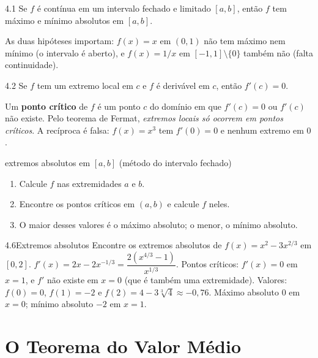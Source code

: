 \begin{teorema}{4.1}
Se $f$ é contínua em um intervalo fechado e limitado $[a,b]$, então $f$ tem máximo e mínimo
absolutos em $[a,b]$.
\end{teorema}

As duas hipóteses importam: $f(x)=x$ em $(0,1)$ não tem máximo nem mínimo (o intervalo é
aberto), e $f(x)=1/x$ em $[-1,1]\setminus\{0\}$ também não (falta continuidade).

\begin{teorema}{4.2}
Se $f$ tem um extremo local em $c$ e $f$ é derivável em $c$, então $f'(c)=0$.
\end{teorema}

Um \textbf{ponto crítico} de $f$ é um ponto $c$ do domínio em que $f'(c)=0$ ou $f'(c)$ não
existe. Pelo teorema de Fermat, \emph{extremos locais só ocorrem em pontos críticos}. A
recíproca é falsa: $f(x)=x^3$ tem $f'(0)=0$ e nenhum extremo em $0$.

\begin{estrategia}{extremos absolutos em $[a,b]$ (método do intervalo fechado)}
\begin{enumerate}[label=\arabic*.]
\item Calcule $f$ nas extremidades $a$ e $b$.
\item Encontre os pontos críticos em $(a,b)$ e calcule $f$ neles.
\item O maior desses valores é o máximo absoluto; o menor, o mínimo absoluto.
\end{enumerate}
\end{estrategia}

\begin{exemplo}{4.6}{Extremos absolutos}
Encontre os extremos absolutos de $f(x)=x^2-3x^{2/3}$ em $[0,2]$.
\solucao
$f'(x)=2x-2x^{-1/3}=\dfrac{2(x^{4/3}-1)}{x^{1/3}}$. Pontos críticos: $f'(x)=0$ em $x=1$, e
$f'$ não existe em $x=0$ (que é também uma extremidade). Valores: $f(0)=0$, $f(1)=-2$ e
$f(2)=4-3\sqrt[3]4\approx-0{,}76$. Máximo absoluto $0$ em $x=0$; mínimo absoluto $-2$ em $x=1$.
\end{exemplo}

\section{O Teorema do Valor Médio}

